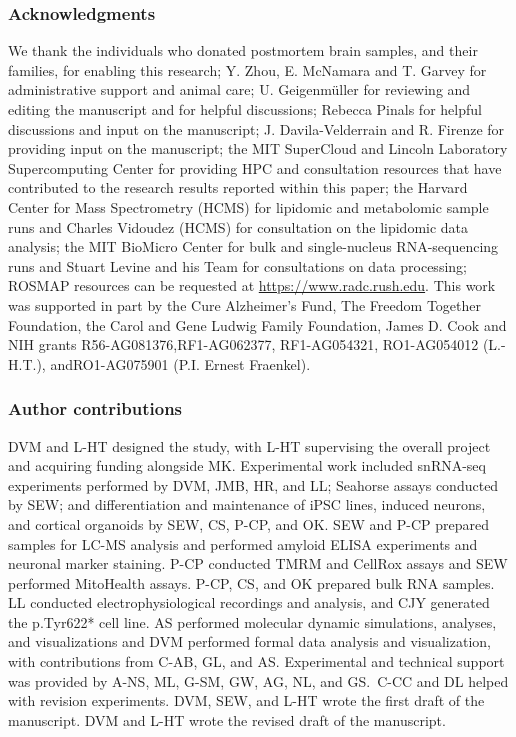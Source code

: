 \subsubsection{Acknowledgments}
We thank the individuals who donated postmortem brain samples, and their families, for enabling this research; Y. Zhou, E. McNamara and T. Garvey for administrative support and animal care; U. Geigenmüller for reviewing and editing the manuscript and for helpful discussions; Rebecca Pinals for helpful discussions and input on the manuscript; J. Davila-Velderrain and R. Firenze for providing input on the manuscript; the MIT SuperCloud and Lincoln Laboratory Supercomputing Center for providing HPC and consultation resources that have contributed to the research results reported within this paper; the Harvard Center for Mass Spectrometry (HCMS) for lipidomic and metabolomic sample runs and Charles Vidoudez (HCMS) for consultation on the lipidomic data analysis; the MIT BioMicro Center for bulk and single-nucleus RNA-sequencing runs and Stuart Levine and his Team for consultations on data processing; ROSMAP resources can be requested at \url{https://www.radc.rush.edu}. This work was supported in part by the Cure Alzheimer’s Fund, The Freedom Together Foundation, the Carol and Gene Ludwig Family Foundation, James D. Cook and NIH grants R56-AG081376,RF1-AG062377, RF1-AG054321, RO1-AG054012 (L.-H.T.), andRO1-AG075901 (P.I. Ernest Fraenkel).

\subsubsection{Author contributions}
DVM and L-HT designed the study, with L-HT supervising the overall project and acquiring funding alongside MK. Experimental work included snRNA-seq experiments performed by DVM, JMB, HR, and LL; Seahorse assays conducted by SEW; and differentiation and maintenance of iPSC lines, induced neurons, and cortical organoids by SEW, CS, P-CP, and OK. SEW and P-CP prepared samples for LC-MS analysis and performed amyloid ELISA experiments and neuronal marker staining. P-CP conducted TMRM and CellRox assays and SEW performed MitoHealth assays. P-CP, CS, and OK prepared bulk RNA samples. LL conducted electrophysiological recordings and analysis, and CJY generated the p.Tyr622* cell line. AS performed molecular dynamic simulations, analyses, and visualizations and DVM performed formal data analysis and visualization, with contributions from C-AB, GL, and AS. Experimental and technical support was provided by A-NS, ML, G-SM, GW, AG, NL, and GS. C-CC and DL helped with revision experiments. DVM, SEW, and L-HT wrote the first draft of the manuscript. DVM and L-HT wrote the revised draft of the manuscript.

